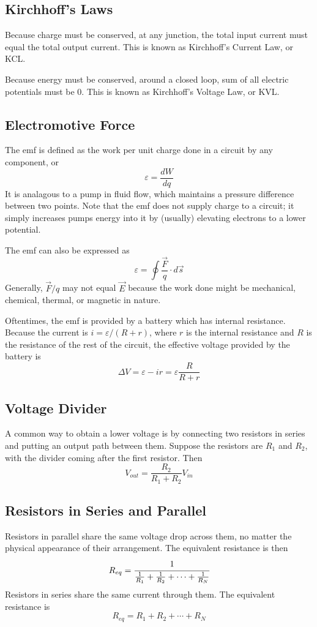 \documentclass[../PhysicsFormulae]{subfiles}
\begin{document}
\subsection{Kirchhoff's Laws}
Because charge must be conserved, at any junction, the total input current must equal the total output current. This is known as Kirchhoff's Current Law, or KCL. \bigskip

Because energy must be conserved, around a closed loop, sum of all electric potentials must be 0. This is known as Kirchhoff's Voltage Law, or KVL. 

\subsection{Electromotive Force}
The emf is defined as the work per unit charge done in a circuit by any component, or 
\[ \varepsilon = \frac{dW}{dq} \]
It is analagous to a pump in fluid flow, which maintains a pressure difference between two points. Note that the emf does not supply charge to a circuit; it simply increases pumps energy into it by (usually) elevating electrons to a lower potential. \bigskip

The emf can also be expressed as 
\[ \varepsilon = \oint \frac{\vec{F}}{q} \cdot d\vec{s} \]
Generally, $\vec{F}/q$ may not equal $\vec{E}$ because the work done might be mechanical, chemical, thermal, or magnetic in nature. \bigskip

Oftentimes, the emf is provided by a battery which has internal resistance. Because the current is $i = \varepsilon / (R + r)$, where $r$ is the internal resistance and $R$ is the resistance of the rest of the circuit, the effective voltage provided by the battery is 
\[ \Delta V = \varepsilon - ir = \varepsilon \frac{R}{R+r} \]

\subsection{Voltage Divider}
A common way to obtain a lower voltage is by connecting two resistors in series and putting an output path between them. Suppose the resistors are $R_1$ and $R_2$, with the divider coming after the first resistor. Then 
\[ V_{out} = \frac{R_2}{R_1 + R_2} V_{in} \]

\subsection{Resistors in Series and Parallel}
Resistors in parallel share the same voltage drop across them, no matter the physical appearance of their arrangement. The equivalent resistance is then 
\[ R_{eq} = \cfrac{1}{\frac{1}{R_1} + \frac{1}{R_2} + \cdots + \frac{1}{R_N}} \]
Resistors in series share the same current through them. The equivalent resistance is 
\[ R_{eq} = R_1 + R_2 + \cdots + R_N \]
\end{document}
